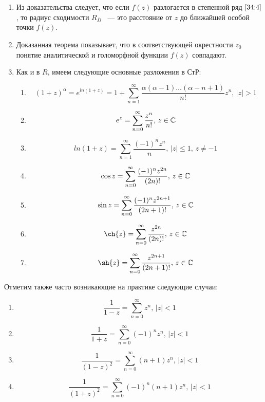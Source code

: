 \documentclass[../../main.tex]{subfiles}
\begin{document}
\begin{rem}
	\begin{enumerate}
		\item Из доказательства следует, что если $ f(z) $ разлогается в степенной ряд $ \eqref{34:4} $, то радиус сходимости $ R_{\overline{D}} $ ~--- это расстояние от $ z $ до ближайшей особой точки $ f(z) $.
		
		\item Доказанная теорема показывает, что в соответствующей окрестности $ z_0 $ понятие аналитической и голоморфной функции $f(z)$ совпадают.
		
		\item Как и в $R$, имеем следующие основные разложения в СтР:
		
		\begin{enumerate}
			\item \[ (1 + z)^\alpha = e^{ln(1 + z)} = 1 + \sum\limits_{n = 1}^{\infty} \frac{\alpha(\alpha - 1) \ldots (\alpha - n +1)}{n!}z^n,\, |z| > 1 \]
			
			\item \[ e^z = \sum\limits_{n = 0}^{\infty} \frac{z^n}{n!},\, z \in \mathbb{C} \]
			
			\item \[ ln(1 + z) = \sum\limits_{n = 1}^{\infty} \frac{(-1)^nz^n}{n},\, |z| \leq 1,\, z \neq -1 \]
			
			\item \[ \cos{z} = \sum\limits_{n = 0}^{\infty} \frac{(-1)^nz^{2n}}{(2n)!},\, z \in \mathbb{C} \]
			
			\item \[ \sin{z} = \sum\limits_{n = 0}^{\infty} \frac{(-1)^nz^{2n + 1}}{(2n + 1)!},\, z \in \mathbb{C} \]
			
			\item \[ \ch{z} = \sum\limits_{n = 0}^{\infty} \frac{z^{2n}}{(2n)!},\, z \in \C \]
			
			\item \[ \sh{z} = \sum\limits_{n = 0}^{\infty} \frac{z^{2n + 1}}{(2n + 1)!},\, z \in \C \]
		\end{enumerate}
	\end{enumerate}
\end{rem}

Отметим также часто возникающие на практике следующие случаи:

\begin{enumerate}
	\item \[ \frac{1}{1 - z} = \sum\limits_{n = 0}^{\infty} z^n,\, |z| < 1 \]
	
	\item \[ \frac{1}{1 + z} = \sum\limits_{n = 0}^{\infty} (-1)^nz^n,\, |z| < 1 \]

	\item \[ \frac{1}{(1 - z)^2} = \sum\limits_{n = 0}^{\infty} (n + 1)z^n,\, |z| < 1 \]
	
	\item \[ \frac{1}{(1 + z)^2} = \sum\limits_{n = 0}^{\infty} (-1)^n(n + 1)z^n,\, |z| < 1 \]
\end{enumerate}
\end{document}

